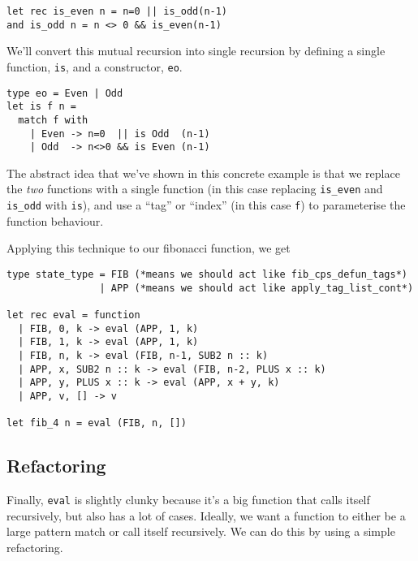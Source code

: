 \begin{code}
\label{code:mutual-recursion}
\begin{verbatim}
let rec is_even n = n=0 || is_odd(n-1)
and is_odd n = n <> 0 && is_even(n-1)
\end{verbatim}
\end{code}

We'll convert this mutual recursion into single recursion by defining a single function, \texttt{is}, and a constructor, \texttt{eo}.

\begin{code}
\label{code:mutual-recursion}
\begin{verbatim}
type eo = Even | Odd
let is f n = 
  match f with
    | Even -> n=0  || is Odd  (n-1)
    | Odd  -> n<>0 && is Even (n-1)
\end{verbatim}
\end{code}

The abstract idea that we've shown in this concrete example is that we replace the \emph{two} functions with a single function (in this case replacing \texttt{is\_even} and \texttt{is\_odd} with \texttt{is}), and use a ``tag'' or ``index'' (in this case \texttt{f}) to parameterise the function behaviour.

Applying this technique to our fibonacci function, we get

\begin{code}
\label{code:defun-list-fib}
\begin{verbatim}
type state_type = FIB (*means we should act like fib_cps_defun_tags*)
                | APP (*means we should act like apply_tag_list_cont*)

let rec eval = function
  | FIB, 0, k -> eval (APP, 1, k)
  | FIB, 1, k -> eval (APP, 1, k)
  | FIB, n, k -> eval (FIB, n-1, SUB2 n :: k)
  | APP, x, SUB2 n :: k -> eval (FIB, n-2, PLUS x :: k)
  | APP, y, PLUS x :: k -> eval (APP, x + y, k)
  | APP, v, [] -> v

let fib_4 n = eval (FIB, n, [])
\end{verbatim}
\end{code}


\subsection{Refactoring}\label{subsection:refactoring}
Finally, \texttt{eval} is slightly clunky because it's a big function that calls itself recursively, but also has a lot of cases. Ideally, we want a function to either be a large pattern match or call itself recursively. We can do this by using a simple refactoring. 


